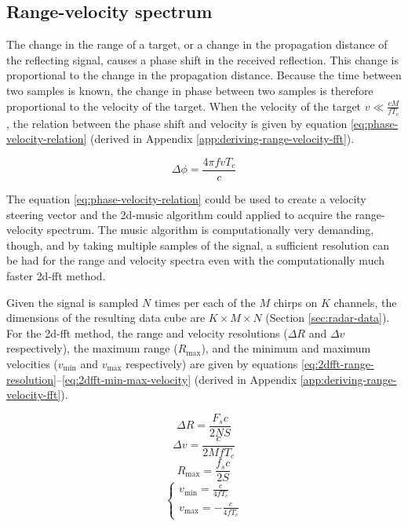 \subsection{Range-velocity spectrum}
\label{sec:doppler-spectrum}
The change in the range of a target, or a change in the propagation distance of the reflecting signal,
causes a phase shift in the received reflection.
This change is proportional to the change in the propagation distance.
Because the time between two samples is known,
the change in phase between two samples is therefore proportional to the velocity of the target.
When the velocity of the target $v \ll \frac{cM}{f T_{c}}$,
the relation between the phase shift and velocity is given by equation \ref{eq:phase-velocity-relation}
(derived in Appendix \ref{app:deriving-range-velocity-fft}).

\begin{equation}
    \label{eq:phase-velocity-relation}
    \Delta \phi = \frac{4 \pi f v T_{c}}{c}
\end{equation}

The equation \ref{eq:phase-velocity-relation} could be used to create a velocity steering vector
and the \gls{2d-music} algorithm could applied to acquire the range-velocity spectrum.
The \gls{music} algorithm is computationally very demanding, though,
and by taking multiple samples of the signal, a sufficient resolution can be had
for the range and velocity spectra even with the computationally much faster \gls{2d-fft} method.

Given the signal is sampled $N$ times per each of the $M$ chirps on $K$ channels,
the dimensions of the resulting data cube are $K \times M \times N$ (Section \ref{sec:radar-data}).
For the \gls{2d-fft} method,
the range and velocity resolutions ($\Delta R$ and $\Delta v$ respectively),
the maximum range ($R_{\mathrm{max}}$),
and the minimum and maximum velocities 
($v_{\mathrm{min}}$ and $v_{\mathrm{max}}$ respectively) are given by equations
\ref{eq:2dfft-range-resolution}--\ref{eq:2dfft-min-max-velocity}
(derived in Appendix \ref{app:deriving-range-velocity-fft}).

\begin{equation}
    \label{eq:2dfft-range-resolution}
    \Delta R = \frac{F_{s} c}{2NS}
\end{equation}
\begin{equation}
    \label{eq:2dfft-velocity-resolution}
    \Delta v = \frac{c}{2 M f T_{c}}
\end{equation}
\begin{equation}
    \label{eq:2dfft-max-range}
    R_{\mathrm{max}} = \frac{f_{s} c}{2 S}
\end{equation}
\begin{equation}
    \label{eq:2dfft-min-max-velocity}
    \begin{cases}
    v_{\mathrm{min}} = \frac{c}{4 f T_{c}} \\
    v_{\mathrm{max}} = - \frac{c}{4 f T_{c}}
    \end{cases}
\end{equation}

